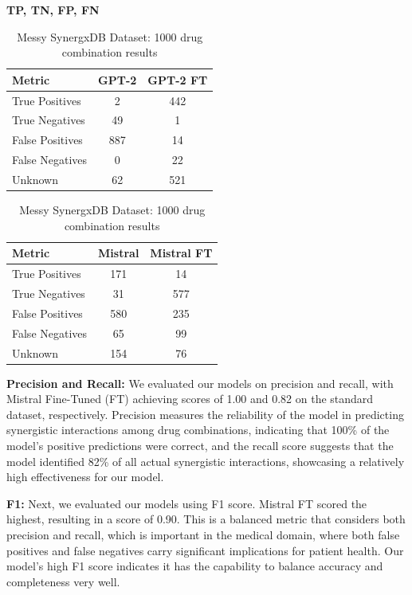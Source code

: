 \documentclass[11pt]{article}
\begin{document}
\begin{table}[ht]
\centering
\caption{Messy SynergxDB Dataset: 1000 drug combination results}
\label{table:result}
\textbf{TP, TN, FP, FN}
\par\medskip %
\begin{tabular}{|l|c|c|}
\hline
\textbf{Metric} & \textbf{GPT-2} & \textbf{GPT-2 FT} \\
\hline
True Positives & 2 & 442 \\
True Negatives & 49 & 1 \\
False Positives & 887 & 14 \\
False Negatives & 0 & 22 \\
Unknown & 62 & 521 \\
\hline
\end{tabular}
\par\medskip %
\begin{tabular}{|l|c|c|}
\hline
\textbf{Metric} & \textbf{Mistral} & \textbf{Mistral FT} \\
\hline
True Positives & 171 & 14 \\
True Negatives & 31 & 577 \\
False Positives & 580 & 235 \\
False Negatives & 65 & 99 \\
Unknown & 154 & 76 \\
\hline
\end{tabular}
\end{table}


\textbf{Precision and Recall:} We evaluated our models on precision and recall, with Mistral Fine-Tuned (FT) achieving scores of 1.00 and 0.82 on the standard dataset, respectively. Precision measures the reliability of the model in predicting synergistic interactions among drug combinations, indicating that 100\% of the model’s positive predictions were correct, and the recall score suggests that the model identified 82\% of all actual synergistic interactions, showcasing a relatively high effectiveness for our model.

\textbf{F1:} Next, we evaluated our models using F1 score. Mistral FT scored the highest, resulting in a score of 0.90. This is a balanced metric that considers both precision and recall, which is important in the medical domain, where both false positives and false negatives carry significant implications for patient health. Our model's high F1 score indicates it has the capability to balance accuracy and completeness very well.
\end{document}
